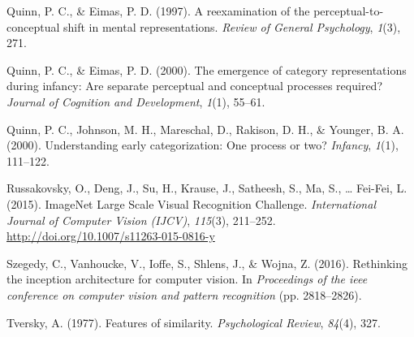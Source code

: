 \documentclass[10pt, letterpaper]{article}
\begin{document}
\hypertarget{ref-quinn1997reexamination}{}
Quinn, P. C., \& Eimas, P. D. (1997). A reexamination of the
perceptual-to-conceptual shift in mental representations. \emph{Review
of General Psychology}, \emph{1}(3), 271.

\hypertarget{ref-quinn2000emergence}{}
Quinn, P. C., \& Eimas, P. D. (2000). The emergence of category
representations during infancy: Are separate perceptual and conceptual
processes required? \emph{Journal of Cognition and Development},
\emph{1}(1), 55--61.

\hypertarget{ref-quinn2000understanding}{}
Quinn, P. C., Johnson, M. H., Mareschal, D., Rakison, D. H., \& Younger,
B. A. (2000). Understanding early categorization: One process or two?
\emph{Infancy}, \emph{1}(1), 111--122.

\hypertarget{ref-ILSVRC15}{}
Russakovsky, O., Deng, J., Su, H., Krause, J., Satheesh, S., Ma, S.,
\ldots{} Fei-Fei, L. (2015). ImageNet Large Scale Visual Recognition
Challenge. \emph{International Journal of Computer Vision (IJCV)},
\emph{115}(3), 211--252. \url{http://doi.org/10.1007/s11263-015-0816-y}

\hypertarget{ref-szegedy2016rethinking}{}
Szegedy, C., Vanhoucke, V., Ioffe, S., Shlens, J., \& Wojna, Z. (2016).
Rethinking the inception architecture for computer vision. In
\emph{Proceedings of the ieee conference on computer vision and pattern
recognition} (pp. 2818--2826).

\hypertarget{ref-tversky1977features}{}
Tversky, A. (1977). Features of similarity. \emph{Psychological Review},
\emph{84}(4), 327.
\end{document}
